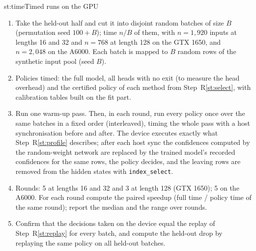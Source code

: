 \begin{step}{st:time}{Timed runs on the GPU}
\begin{enumerate}
  \item Take the held-out half and cut it into disjoint random batches of size $B$ (permutation seed $100+B$); time
  $n/B$ of them, with $n=1{,}920$ inputs at lengths 16 and 32 and $n=768$ at length 128 on the GTX 1650, and
  $n=2{,}048$ on the A6000. Each batch is mapped to $B$ random rows of the synthetic input pool (seed $B$).
  \item Policies timed: the full model, all heads with no exit (to measure the head overhead) and the certified
  policy of each method from Step~R\ref{st:select}, with calibration tables built on the fit part.
  \item Run one warm-up pass. Then, in each round, run every policy once over the same batches in a fixed order
  (interleaved), timing the whole pass with a host synchronisation before and after. The device executes exactly what
  Step~R\ref{st:profile} describes; after each host sync the confidences computed by the random-weight network are
  replaced by the trained model's recorded confidences for the same rows, the policy decides, and the leaving rows are
  removed from the hidden states with \texttt{index\_select}.
  \item Rounds: 5 at lengths 16 and 32 and 3 at length 128 (GTX 1650); 5 on the A6000. For each round compute the
  paired speedup (full time / policy time of the same round); report the median and the range over rounds.
  \item Confirm that the decisions taken on the device equal the replay of Step~R\ref{st:replay} for every batch,
  and compute the held-out drop by replaying the same policy on all held-out batches.
\end{enumerate}
\end{step}

